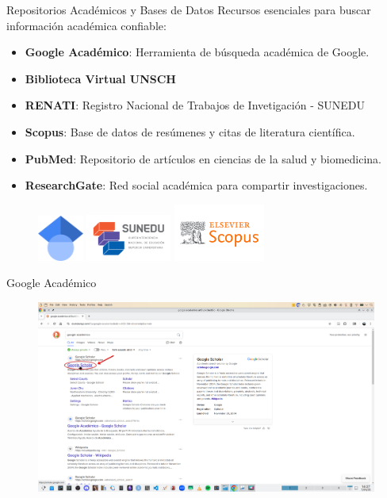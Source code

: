 \documentclass[
11pt, %
]{beamer}
\begin{document}
\begin{frame}{Repositorios Académicos y Bases de Datos}
	Recursos esenciales para buscar información académica confiable:
	\begin{itemize}
		\item \textbf{Google Académico}: Herramienta de búsqueda académica de Google.
		\item \textbf{Biblioteca Virtual UNSCH}
		\item \textbf{RENATI}: Registro Nacional de Trabajos de Invetigación - 	SUNEDU
		\item \textbf{Scopus}: Base de datos de resúmenes y citas de literatura científica.
		\item \textbf{PubMed}: Repositorio de artículos en ciencias de la salud y biomedicina.
		\item \textbf{ResearchGate}: Red social académica para compartir investigaciones.
	\end{itemize}
	\begin{figure}[h!]
		\centering
		\includegraphics[width=1.5cm]{logo googleacademico.png}
		\hspace{0.5cm} %
		\includegraphics[width=2.8cm]{logo sunedu.png}
		\hspace{0.5cm} %
		\includegraphics[width=3cm]{logo scopus.png}
	\end{figure}
\end{frame}

\begin{frame}{Google Académico}
	\begin{figure}[h!]
		\centering
		\includegraphics[width=12cm]{screenshot_20250107_142718 1.png}
	\end{figure}
\end{frame}
\end{document}
